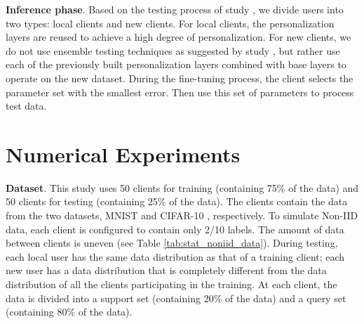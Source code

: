 \documentclass[runningheads]{llncs}
\begin{document}
\textbf{Inference phase}. Based on the testing process of study \cite{liang2020think}, we divide users into two types: local clients and new clients. For local clients, the personalization layers are reused to achieve a high degree of personalization. For new clients, we do not use ensemble testing techniques as suggested by study \cite{liang2020think}, but rather use each of the previously built personalization layers combined with base layers to operate on the new dataset. During the fine-tuning process, the client selects the parameter set with the smallest error. Then use this set of parameters to process test data.

\section{Numerical Experiments}

\textbf{Dataset}. This study uses 50 clients for training (containing 75\% of the data) and 50 clients for testing (containing 25\% of the data). The clients contain the data from the two datasets, MNIST \cite{deng2012mnist} and CIFAR-10 \cite{krizhevsky2009learning}, respectively. To simulate Non-IID data, each client is configured to contain only 2/10 labels. The amount of data between clients is uneven (see Table \ref{tab:stat_noniid_data}). During testing, each local user has the same data distribution as that of a training client; each new user has a data distribution that is completely different from the data distribution of all the clients participating in the training. At each client, the data is divided into a support set (containing 20\% of the data) and a query set (containing 80\% of the data).

\end{document}
